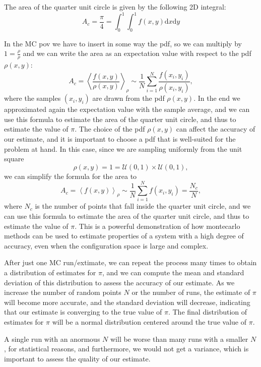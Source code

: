 The area of the quarter unit circle is given by the following 2D integral:
\[
    A_c = \frac{\pi}{4} = \int_0^1 \int_0^1 f(x, y) \mathrm{d} x \mathrm{d} y
\]

In the MC pov we have to insert in some way the pdf, so we can multiply by \(1=\frac{\rho}{\rho}\) and we can write the area as an expectation value with respect to the pdf \(\rho(x,y)\):
\[
    A_c = \left\langle \frac{f(x,y)}{\rho(x,y)} \right\rangle_{\rho} \sim \frac{1}{N} \sum_{i=1}^N \frac{f(x_i, y_i)}{\rho(x_i, y_i)},
\]
where the samples \((x_i, y_i)\) are drawn from the pdf \(\rho(x,y)\). In the end we approximated again the expectation value with the sample average, and we can use this formula to estimate the area of the quarter unit circle, and thus to estimate the value of \(\pi\). The choice of the pdf \(\rho(x,y)\) can affect the accuracy of our estimate, and it is important to choose a pdf that is well-suited for the problem at hand. In this case, since we are sampling uniformly from the unit square
\[
    \rho(x,y) = 1 = \mathcal{U}(0,1) \times \mathcal{U}(0,1),
\]
we can simplify the formula for the area to
\[
    A_c = \left\langle f(x,y) \right\rangle_{\rho} \sim \frac{1}{N} \sum_{i=1}^N f(x_i, y_i) = \frac{N_c}{N},
\]
where \(N_c\) is the number of points that fall inside the quarter unit circle, and we can use this formula to estimate the area of the quarter unit circle, and thus to estimate the value of \(\pi\). This is a powerful demonstration of how montecarlo methods can be used to estimate properties of a system with a high degree of accuracy, even when the configuration space is large and complex.

After just one MC run/extimate, we can repeat the process many times to obtain a distribution of estimates for \(\pi\), and we can compute the mean and standard deviation of this distribution to assess the accuracy of our estimate. As we increase the number of random points \(N\) or the number of runs, the estimate of \(\pi\) will become more accurate, and the standard deviation will decrease, indicating that our estimate is converging to the true value of \(\pi\). The final distribution of estimates for \(\pi\) will be a normal distribution centered around the true value of \(\pi\).

A single run with an anormous \(N\) will be worse than many runs with a smaller \(N\), for statistical reasons, and furthermore, we would not get a variance, which is important to assess the quality of our estimate.

